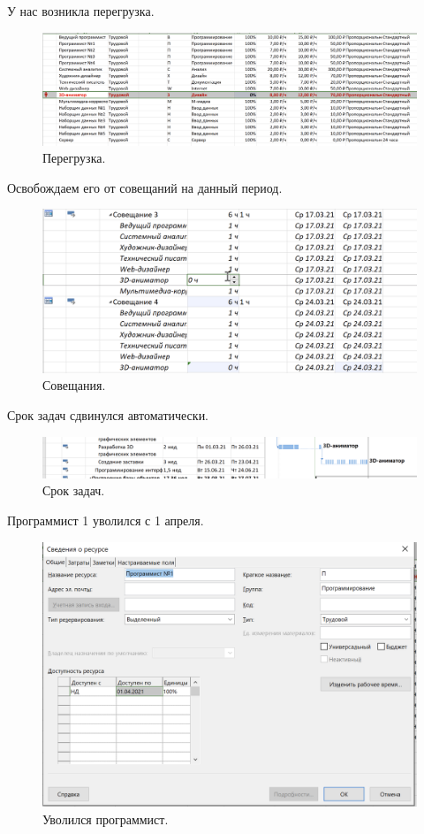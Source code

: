 \documentclass[a4paper,14pt]{extreport} %
\begin{document}
\begin{enumerate}
У нас возникла перегрузка.

\begin{figure}[H]
  \centering
  \caption{Перегрузка. }
  \includegraphics[scale=0.5]{4}
\end{figure}

Освобождаем его от совещаний на данный период.

\begin{figure}[H]
  \centering
  \caption{Совещания. }
  \includegraphics[scale=0.7]{5}
\end{figure}

Срок задач сдвинулся автоматически.

\begin{figure}[H]
  \centering
  \caption{Срок задач. }
  \includegraphics[scale=0.5]{8}
\end{figure}

Программист 1 уволился с 1 апреля.

\begin{figure}[H]
  \centering
  \caption{Уволился программист. }
  \includegraphics[scale=0.5]{7}
\end{figure}


\end{enumerate}
\end{document}
